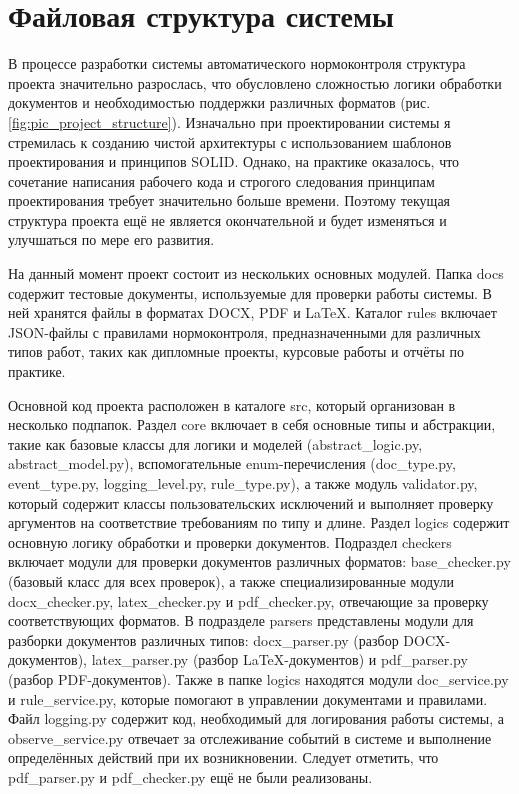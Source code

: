 \documentclass{report}
\begin{document}
\section{Файловая структура системы}

В процессе разработки системы автоматического нормоконтроля структура проекта значительно разрослась, что обусловлено сложностью логики обработки документов и необходимостью поддержки различных форматов (рис. \ref{fig:pic_project_structure}). Изначально при проектировании системы я стремилась к созданию чистой архитектуры с использованием шаблонов проектирования и принципов SOLID. Однако, на практике оказалось, что сочетание написания рабочего кода и строгого следования принципам проектирования требует значительно больше времени. Поэтому текущая структура проекта ещё не является окончательной и будет изменяться и улучшаться по мере его развития.


На данный момент проект состоит из нескольких основных модулей. 
Папка docs содержит тестовые документы, используемые для проверки работы системы. В ней хранятся файлы в форматах DOCX, PDF и LaTeX. 
Каталог rules включает JSON-файлы с правилами нормоконтроля, предназначенными для различных типов работ, таких как дипломные проекты, курсовые работы и отчёты по практике. 

Основной код проекта расположен в каталоге src, который организован в несколько подпапок. 
Раздел core включает в себя основные типы и абстракции, такие как базовые классы для логики и моделей (abstract\_logic.py, abstract\_model.py), вспомогательные enum-перечисления (doc\_type.py, event\_type.py, logging\_level.py, rule\_type.py), а также модуль validator.py, который содержит классы пользовательских исключений и выполняет проверку аргументов на соответствие требованиям по типу и длине. 
Раздел logics содержит основную логику обработки и проверки документов. Подраздел checkers включает модули для проверки документов различных форматов: base\_checker.py (базовый класс для всех проверок), а также специализированные модули docx\_checker.py, latex\_checker.py и pdf\_checker.py, отвечающие за проверку соответствующих форматов. 
В подразделе parsers представлены модули для разборки документов различных типов: docx\_parser.py (разбор DOCX-документов), latex\_parser.py (разбор LaTeX-документов) и pdf\_parser.py (разбор PDF-документов). 
Также в папке logics находятся модули doc\_service.py и rule\_service.py, которые помогают в управлении документами и правилами. Файл logging.py содержит код, необходимый для логирования работы системы, а observe\_service.py отвечает за отслеживание событий в системе и выполнение определённых действий при их возникновении. Следует отметить, что pdf\_parser.py и pdf\_checker.py ещё не были реализованы.
\end{document}
